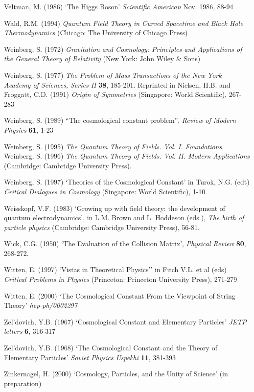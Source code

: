 \documentclass[12pt]{article}
\begin{document}
\begin{thebibliography}{X}
Veltman, M. (1986) `The Higgs Boson' {\em Scientific American}
Nov. 1986, 88-94

 Wald, R.M. (1994) {\em Quantum Field Theory in Curved
Spacetime and Black Hole Thermodynamics}
(Chicago: The University of Chicago Press)

 Weinberg, S. (1972) {\em Gravitation and Cosmology:
Principles and Applications of the General Theory of Relativity}
(New York: John Wiley \& Sons)

 Weinberg, S. (1977) {\em The Problem of Mass}
{\em Transactions of the New York Academy of Sciences, Series  II} {\bf 38},
185-201. Reprinted in Nielsen, H.B. and Froggatt, C.D. (1991) 
{\em Origin of Symmetries} (Singapore: World Scientific), 267-283

Weinberg, S. (1989)
``The cosmological constant problem'',
{\em Review of Modern Physics} {\bf 61}, 1-23

Weinberg, S. (1995) {\em The Quantum Theory of Fields. Vol. I.
Foundations}. Weinberg, S. (1996) {\em The Quantum Theory of Fields. Vol. II.
Modern Applications} (Cambridge: Cambridge University Press).

 Weinberg, S. (1997) `Theories of the Cosmological
Constant' in Turok, N.G. (edt) {\em Critical Dialogues in
Cosmology} (Singapore: World Scientific), 1-10

 Weisskopf, V.F. (1983)
`Growing up with field theory: the
development of quantum electrodynamics', in L.M. Brown and L. Hoddeson
(eds.), {\em
The birth of particle physics}
(Cambridge: Cambridge University Press), 56-81.

 Wick, C.G. (1950) `The Evaluation of the Collision Matrix',
{\em Physical Review} {\bf 80}, 268-272.

 Witten, E. (1997) `Vistas in Theoretical Physics'' in
Fitch V.L. et al (eds) {\em Critical Problems in Physics} 
(Princeton: Princeton University Press), 271-279

 Witten, E. (2000) `The Cosmological Constant
From the Viewpoint of String Theory' {\em hep-ph/0002297}

 Zel'dovich, Y.B. (1967) `Cosmological Constant
and Elementary Particles' {\em JETP letters} {\bf 6}, 316-317

Zel'dovich, Y.B. (1968) `The Cosmological Constant and the Theory
of Elementary Particles' {\em Soviet Physics Uspekhi} {\bf 11},
381-393

Zinkernagel, H. (2000) `Cosmology, Particles, and the Unity of Science'
(in preparation)

\end{thebibliography}
\end{document}
